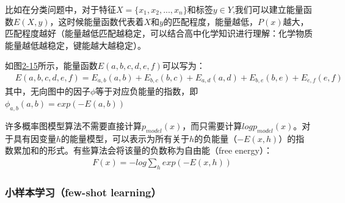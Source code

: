 比如在分类问题中，对于特征$X = \{x_1,x_2,...,x_n\}$和标签$y \in Y$,我们可以建立能量函数$E(X,y)$，这时候能量函数代表着$X$和$y$的匹配程度，能量越低，$P(x)$越大，匹配程度越好（能量越低匹配越稳定，可以结合高中化学知识进行理解：化学物质能量越低越稳定，键能越大越稳定）。

如图\href{fig:2-15}{2-15}所示，能量函数$E(a,b,c,d,e,f)$可以写为：
\begin{align}
&E(a,b,c,d,e,f) = E_{a,b}(a,b) + E_{b,c}(b,c) + E_{a,d}(a,d) + E_{b,e}(b,e) + E_{e,f}(e,f)
\end{align}
其中，无向图中的因子$\phi$等于对应负能量的指数，即$\phi_{a,b}(a,b) = exp(-E(a,b))$

许多概率图模型算法不需要直接计算$p_{model}(x)$，而只需要计算$log p_{model}(x)$。对于具有因变量$h$的能量模型，可以表示为所有关于$h$的负能量（$-E(x,h)$）的指数累加和的形式。有些算法会将该量的负数称为自由能（free energy）：
\begin{align}
&F(x) = -log \sum_h exp(-E(x,h))
\end{align}





\subsubsection{小样本学习（few-shot learning）}

